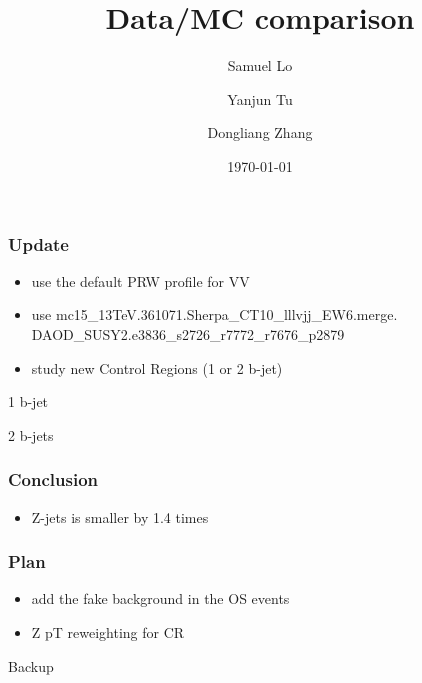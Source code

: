 \documentclass[mathserif,serif]{beamer}
\title{Data/MC comparison}
\author
{
Samuel Lo \inst{1}
\and
Yanjun Tu  \inst{1}
\and
Dongliang Zhang  \inst{2}
}
\institute
{
\inst{1}
The University of Hong Kong
\and
\inst{2}
University of Michigan
}
\date{\today}
\begin{document}
\frame{\titlepage}

\begin{frame}
\frametitle{Update}
\begin{itemize}
\item use the default PRW profile for VV
\item use mc15\_13TeV.361071.Sherpa\_CT10\_lllvjj\_EW6.merge. \\
DAOD\_SUSY2.e3836\_s2726\_r7772\_r7676\_p2879
\item study new Control Regions (1 or 2 b-jet)
\end{itemize}
\end{frame}

\def \PathToPlot {../plot}

\begin{frame}
\begin{center}
\huge
1 b-jet
\end{center}
\end{frame}




\begin{frame}
\begin{center}
\huge
2 b-jets
\end{center}
\end{frame}





%

\begin{frame}
\frametitle{Conclusion}
\begin{itemize}
\item Z-jets is smaller by 1.4 times
\end{itemize}
\end{frame}

\begin{frame}
\frametitle{Plan}
\begin{itemize}
\item add the fake background in the OS events
\item Z pT reweighting for CR
\end{itemize}
\end{frame}

\begin{frame}
\begin{center}
\huge
Backup
\end{center}
\end{frame}
\end{document}
